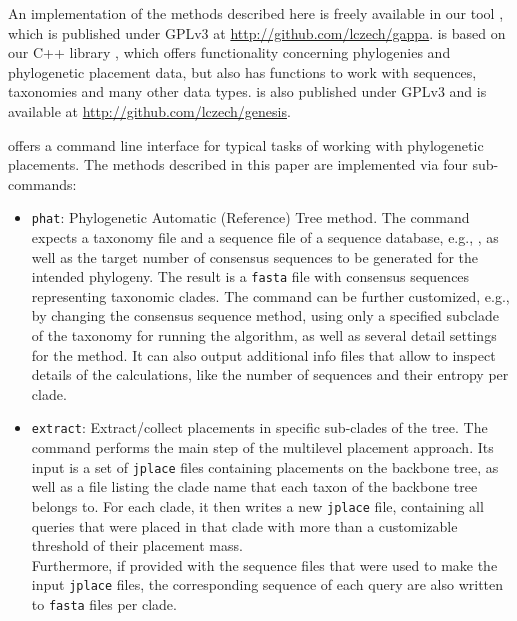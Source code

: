 An implementation of the methods described here is freely available in our tool ,
which is published under GPLv3 at \url{http://github.com/lczech/gappa}.
 is based on our C++ library ,
which offers functionality concerning phylogenies and phylogenetic placement data,
but also has functions to work with sequences, taxonomies and many other data types.
 is also published under GPLv3 and is available at \url{http://github.com/lczech/genesis}.

 offers a command line interface for typical tasks of working with phylogenetic placements.
The methods described in this paper are implemented via four sub-commands:

\begin{itemize}
    \item \texttt{phat}: Phylogenetic Automatic (Reference) Tree method.
          The command expects a taxonomy file and a sequence file of a sequence database,
          e.g.,  \citep{Quast2013,Yilmaz2014},
          as well as the target number of consensus sequences to be generated for the intended phylogeny.
          The result is a \texttt{fasta} file with consensus sequences representing taxonomic clades.
          The command can be further customized, e.g., by changing the consensus sequence method,
          using only a specified subclade of the taxonomy for running the algorithm,
          as well as several detail settings for the method.
          It can also output additional info files that allow to inspect details of the calculations,
          like the number of sequences and their entropy per clade.
    \item \texttt{extract}: Extract/collect placements in specific sub-clades of the tree.
          The command performs the main step of the multilevel placement approach.
          Its input is a set of \texttt{jplace} files containing placements on the backbone tree,
          as well as a file listing the clade name that each taxon of the backbone tree belongs to.
          For each clade, it then writes a new \texttt{jplace} file,
          containing all queries that were placed in that clade with more than a customizable threshold
          of their placement mass.
          \\
          Furthermore, if provided with the sequence files that were used to make the input \texttt{jplace} files,
          the corresponding sequence of each query are also written to \texttt{fasta} files per clade.

\end{itemize}
